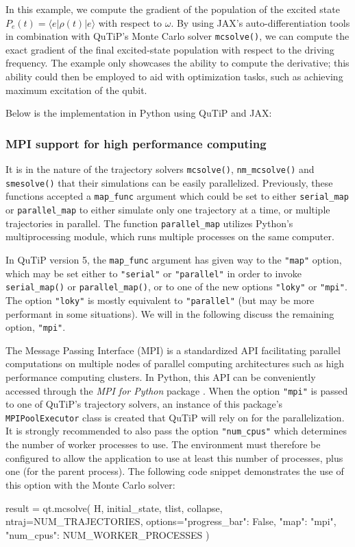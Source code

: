 \documentclass[preprint,3p,sort&compress]{elsarticle}
\def\code#1{\texttt{#1}}
\begin{document}
In this example, we compute the gradient of the population of the excited state $P_e(t) = \langle e | \rho(t) | e \rangle$ with respect to $\omega$. By using JAX's auto-differentiation tools in combination with QuTiP's Monte Carlo solver \code{mcsolve()}, we can compute the exact gradient of the final excited-state population with respect to the driving frequency. The example only showcases the ability to compute the derivative; this ability could then be employed to aid with optimization tasks, such as achieving maximum excitation of the qubit.

Below is the implementation in Python using QuTiP and JAX:
\newpage 
{}


\subsubsection{MPI support for high performance computing}

It is in the nature of the trajectory solvers \code{mcsolve()}, \code{nm\_mcsolve()} and \code{smesolve()} that their simulations can be easily parallelized.
Previously, these functions accepted a \code{map\_func} argument which could be set to either \code{serial\_map} or \code{parallel\_map} to either simulate only one trajectory at a time, or multiple trajectories in parallel.
The function \code{parallel\_map} utilizes Python's multiprocessing module, which runs multiple processes on the same computer.

In QuTiP version 5, the \code{map\_func} argument has given way to the \code{"map"} option, which may be set either to \code{"serial"} or \code{"parallel"} in order to invoke \code{serial\_map()} or \code{parallel\_map()}, or to one of the new options \code{"loky"} or \code{"mpi"}.
The option \code{"loky"} is mostly equivalent to \code{"parallel"} (but may be more performant in some situations).
We will in the following discuss the remaining option, \code{"mpi"}.

The Message Passing Interface (MPI) is a standardized API facilitating parallel computations on multiple nodes of parallel computing architectures such as high performance computing clusters.
In Python, this API can be conveniently accessed through the \emph{MPI for Python} package \cite{DalcinJParallelDistribComput2005, DalcinJParallelDistribComput2008, DalcinAdvWaterResour2011, DalcinComputSciEng2021}.
When the option \code{"mpi"} is passed to one of QuTiP's trajectory solvers, an instance of this package's \code{MPIPoolExecutor} class is created that QuTiP will rely on for the parallelization.
It is strongly recommended to also pass the option \code{"num\_cpus"} which determines the number of worker processes to use.
The environment must therefore be configured to allow the application to use at least this number of processes, plus one (for the parent process).
The following code snippet demonstrates the use of this option with the Monte Carlo solver:
\newpage
\begin{python}
result = qt.mcsolve(
    H, initial_state, tlist, collapse, ntraj=NUM_TRAJECTORIES,
    options={"progress_bar": False, "map": "mpi", "num_cpus": NUM_WORKER_PROCESSES}
)
\end{python}
\end{document}

